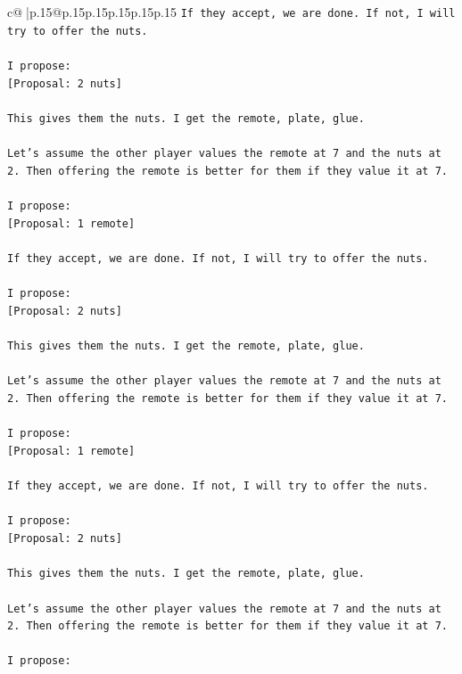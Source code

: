 \documentclass{article}
\begin{document}
{\begin{supertabular}{c@{$\;$}|p{.15\linewidth}@{}p{.15\linewidth}p{.15\linewidth}p{.15\linewidth}p{.15\linewidth}p{.15\linewidth}}
{{{\texttt{If they accept, we are done. If not, I will try to offer the nuts.} \\
\\ 
\texttt{I propose:} \\
\texttt{{[}Proposal: 2 nuts{]}} \\
\\ 
\texttt{This gives them the nuts. I get the remote, plate, glue.} \\
\\ 
\texttt{Let's assume the other player values the remote at 7 and the nuts at 2. Then offering the remote is better for them if they value it at 7.} \\
\\ 
\texttt{I propose:} \\
\texttt{{[}Proposal: 1 remote{]}} \\
\\ 
\texttt{If they accept, we are done. If not, I will try to offer the nuts.} \\
\\ 
\texttt{I propose:} \\
\texttt{{[}Proposal: 2 nuts{]}} \\
\\ 
\texttt{This gives them the nuts. I get the remote, plate, glue.} \\
\\ 
\texttt{Let's assume the other player values the remote at 7 and the nuts at 2. Then offering the remote is better for them if they value it at 7.} \\
\\ 
\texttt{I propose:} \\
\texttt{{[}Proposal: 1 remote{]}} \\
\\ 
\texttt{If they accept, we are done. If not, I will try to offer the nuts.} \\
\\ 
\texttt{I propose:} \\
\texttt{{[}Proposal: 2 nuts{]}} \\
\\ 
\texttt{This gives them the nuts. I get the remote, plate, glue.} \\
\\ 
\texttt{Let's assume the other player values the remote at 7 and the nuts at 2. Then offering the remote is better for them if they value it at 7.} \\
\\ 
\texttt{I propose:} \\
}}}
\end{supertabular}}
\end{document}
